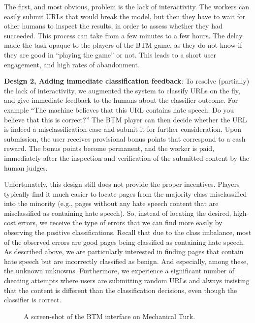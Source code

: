 The first, and most obvious, problem is the lack of interactivity.  The workers can easily submit URLs that would break the model, but then they have to wait for other humans to inspect the results, in order to assess whether they had succeeded. This process can take from a few minutes to a few hours. The delay made the task opaque to the players of the BTM game,
as they do not know if they are good in ``playing the game'' or not. This leads to a short user engagement, and high rates of abandonment.

\textbf{Design 2, Adding immediate classification feedback}: To resolve (partially) the lack of interactivity, we augmented the system to classify URLs on the fly, and give immediate feedback to the humans about the classifier outcome. For example ``The machine believes that this URL contains hate speech.  Do you believe that this is correct?'' The BTM player can then decide whether the URL is indeed a misclassification case and submit it for further consideration. Upon submission, the user receives provisional bonus points that correspond to a cash reward. The bonus points become permanent, and the worker is paid, immediately after the inspection and verification of the submitted content by the human judges.
  

Unfortunately, this design still does not provide the proper incentives. Players typically find it much easier to locate pages from the majority class misclassified into the minority (e.g., pages without any hate speech content that are misclassified as containing hate speech). So, instead of locating the desired, high-cost errors, we receive the type of errors that we can find more easily by observing the positive classifications.  Recall that due to the class imbalance, most of the observed errors are good pages being classified as containing hate speech. As described above, we are particularly interested in finding pages that contain hate speech but are incorrectly classified as benign.  And especially, among these, the unknown unknowns. Furthermore, we experience a significant number of cheating attempts where users are submitting random URLs and always insisting that the content is different than the classification decisions, even though the classifier is correct.

\begin{figure}[t]
\caption{A screen-shot of the BTM interface on Mechanical Turk.}
\label{fig:btm}
\end{figure}

